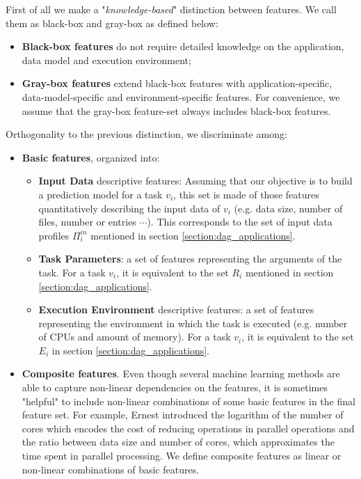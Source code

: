 \documentclass[a4paper, 10pt, conference]{ieeeconf}      %
\begin{document}
First of all we make a "\textit{knowledge-based}" distinction between features. We call them as black-box and gray-box as defined below:
\begin{itemize}
    \item \textbf{Black-box features} do not require detailed knowledge on the application, data model and execution environment;
    \item \textbf{Gray-box features} 
    extend black-box features with application-specific, data-model-specific and environment-specific features. For convenience, we assume that the gray-box feature-set always includes black-box features.
\end{itemize}
Orthogonality to the previous distinction, we discriminate among:
\begin{itemize}
    \item \textbf{Basic features}, organized into:
    \begin{itemize}
        \item \textbf{Input Data} descriptive features: Assuming that our objective is to build a prediction model for a task $v_i$, this set is made of those features quantitatively describing the input data of $v_i$ (e.g. data size, number of files, number or entries $\cdots$). This corresponds to the set of input data profiles $\Pi^{in}_i$ mentioned in section \ref{section:dag_applications}.
        \item \textbf{Task Parameters}: a set of features representing the arguments of the task. For a task $v_i$, it is equivalent to the set $R_i$ mentioned in  section \ref{section:dag_applications}.
        \item \textbf{Execution Environment} descriptive features: a set of features representing the environment in which the task is executed (e.g. number of CPUs and amount of memory). For a task $v_i$, it is equivalent to the set $E_i$ in  section \ref{section:dag_applications}.
    \end{itemize}
    \item \textbf{Composite features}. Even though several machine learning methods are able to capture non-linear dependencies on the features, it is sometimes "helpful" to include non-linear combinations of some basic features in the final feature set. For example, Ernest \cite{ernest} 
    introduced the logarithm of the number of cores which encodes the cost of reducing operations in parallel operations and the ratio between data size and number of cores, which approximates the time spent in parallel processing. 
    We define composite features as linear or non-linear combinations of basic features.
\end{itemize}
\end{document}
